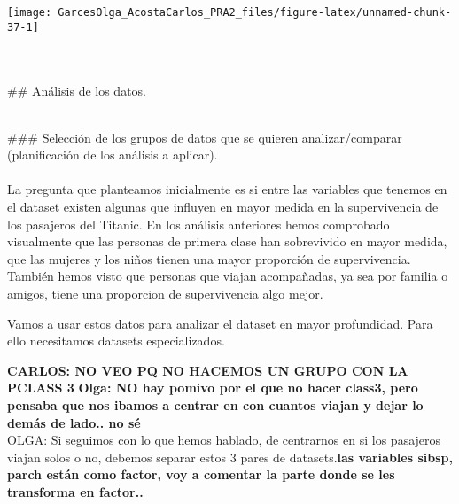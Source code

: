 \documentclass[
]{article}
\newenvironment{Shaded}{\begin{snugshade}}{\end{snugshade}}
\newcommand{\CommentTok}[1]{\textcolor[rgb]{0.56,0.35,0.01}{\textit{#1}}}
\newcommand{\DecValTok}[1]{\textcolor[rgb]{0.00,0.00,0.81}{#1}}
\newcommand{\NormalTok}[1]{#1}
\newcommand{\OperatorTok}[1]{\textcolor[rgb]{0.81,0.36,0.00}{\textbf{#1}}}
\newcommand{\StringTok}[1]{\textcolor[rgb]{0.31,0.60,0.02}{#1}}
\begin{document}
\begin{center}\texttt{[image: GarcesOlga\_AcostaCarlos\_PRA2\_files/figure-latex/unnamed-chunk-37-1]} \end{center}

\texttt{}~\\
\texttt{}~\\
\#\# Análisis de los datos.

\texttt{}\\
\#\#\# Selección de los grupos de datos que se quieren analizar/comparar
(planificación de los análisis a aplicar).\\
\texttt{}~\\
La pregunta que planteamos inicialmente es si entre las variables que
tenemos en el dataset existen algunas que influyen en mayor medida en la
supervivencia de los pasajeros del Titanic. En los análisis anteriores
hemos comprobado visualmente que las personas de primera clase han
sobrevivido en mayor medida, que las mujeres y los niños tienen una
mayor proporción de supervivencia. También hemos visto que personas que
viajan acompañadas, ya sea por familia o amigos, tiene una proporcion de
supervivencia algo mejor.\\
\texttt{}

Vamos a usar estos datos para analizar el dataset en mayor profundidad.
Para ello necesitamos datasets especializados.

\texttt{}

\textbf{CARLOS: NO VEO PQ NO HACEMOS UN GRUPO CON LA PCLASS 3}
\textbf{Olga: NO hay pomivo por el que no hacer class3, pero pensaba que
nos ibamos a centrar en con cuantos viajan y dejar lo demás de lado.. no
sé } \texttt{}\\
OLGA: Si seguimos con lo que hemos hablado, de centrarnos en si los
pasajeros viajan solos o no, debemos separar estos 3 pares de
datasets.\textbf{las variables sibsp, parch están como factor, voy a
comentar la parte donde se les transforma en factor..} \texttt{}

\begin{Shaded}
\end{Shaded}
\end{document}
